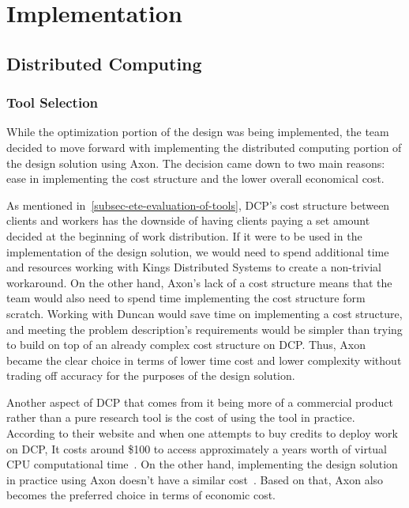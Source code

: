 \documentclass[../mthe-493-final-project.tex]{subfiles}
\begin{document}
    \chapter{Implementation}
    \label{ch:implementation}

    
    \section{Distributed Computing}
    \label{sec:distributed-computing-implementation}

    \subsection{Tool Selection}
    
    While the optimization portion of the design was being implemented, the team decided to move forward with implementing the distributed computing portion of the design solution using Axon. The decision came down to two main reasons: ease in implementing the cost structure and the lower overall economical cost.

    As mentioned in~\autoref{subsec-ete-evaluation-of-tools}, DCP's cost structure between clients and workers has the downside of having clients paying a set amount decided at the beginning of work distribution. If it were to be used in the implementation of the design solution, we would need to spend additional time and resources working with Kings Distributed Systems to create a non-trivial workaround. On the other hand, Axon's lack of a cost structure means that the team would also need to spend time implementing the cost structure form scratch. Working with Duncan would save time on implementing a cost structure, and meeting the problem description's requirements would be simpler than trying to build on top of an already complex cost structure on DCP. Thus, Axon became the clear choice in terms of lower time cost and lower complexity without trading off accuracy for the purposes of the design solution.

    Another aspect of DCP that comes from it being more of a commercial product rather than a pure research tool is the cost of using the tool in practice. According to their website and when one attempts to buy credits to deploy work on DCP, It costs around \$100 to access approximately a years worth of virtual CPU computational time~\cite{kings-ds-marketing}. On the other hand, implementing the design solution in practice using Axon doesn't have a similar cost~\cite{Mays_Axon}. Based on that, Axon also becomes the preferred choice in terms of economic cost.
    
\end{document}
